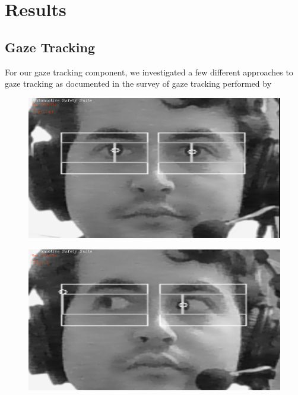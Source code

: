 \section{Results}

\subsection{Gaze Tracking}
For our gaze tracking component, we investigated a few different approaches to gaze tracking as documented in the survey of gaze tracking performed by 
\begin{figure}[H]
    \centering
    \begin{minipage}{.5\textwidth}
      \centering
      \includegraphics[width=\linewidth]{figures/EyeTrackingStraight.png}
      \label{fig:test1}
    \end{minipage}%
    \begin{minipage}{.5\textwidth}
      \centering
      \includegraphics[width=\linewidth]{figures/EyeTrackingRight.png}
      \label{fig:test2}
    \end{minipage}
\end{figure}

